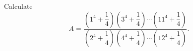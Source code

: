 Calculate
\[
A=\dfrac{\left(1^4+\dfrac{1}{4}\right)\left(3^4+\dfrac{1}{4}\right)\cdots\left(11^4+\dfrac{1}{4}\right)}{\left(2^4+\dfrac{1}{4}\right)\left(4^4+\dfrac{1}{4}\right)\cdots\left(12^4+\dfrac{1}{4}\right)}.
\]
